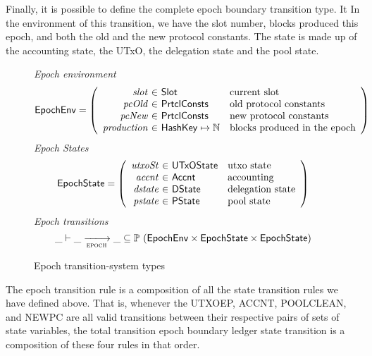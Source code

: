 Finally, it is possible to define the complete epoch boundary transition type. It
In the environment of this transition, we have the slot number, blocks produced
this epoch, and both the old and the new protocol constants. The state is
made up of the accounting state, the UTxO, the delegation state and the
pool state.

\begin{figure}[htb]
  \emph{Epoch environment}
  \begin{equation*}
    \EpochEnv =
    \left(
      \begin{array}{r@{~\in~}ll}
        \var{slot} & \Slot & \text{current slot}\\
        \var{pcOld} & \PrtclConsts & \text{old protocol constants}\\
        \var{pcNew} & \PrtclConsts & \text{new protocol constants}\\
        \var{production} & \HashKey \mapsto \mathbb{N} & \text{blocks produced in the epoch}\\
      \end{array}
    \right)
  \end{equation*}
  \emph{Epoch States}
  \begin{equation*}
    \EpochState =
    \left(
      \begin{array}{r@{~\in~}ll}
        \var{utxoSt} & \UTxOState & \text{utxo state}\\
        \var{accnt} & \Accnt & \text{accounting}\\
        \var{dstate} & \DState & \text{delegation state}\\
        \var{pstate} & \PState & \text{pool state}\\
      \end{array}
    \right)
  \end{equation*}
  \emph{Epoch transitions}
  \begin{equation*}
    \_ \vdash
    \var{\_} \trans{epoch}{} \var{\_}
    \subseteq \powerset (\EpochEnv \times \EpochState \times \EpochState)
  \end{equation*}
  \caption{Epoch transition-system types}
  \label{fig:ts-types:epoch}
\end{figure}


The epoch transition rule is a composition of all the state transition rules
we have defined above. That is, whenever the UTXOEP, ACCNT, POOLCLEAN, and
NEWPC are all valid transitions between their respective pairs of sets of
state variables, the total transition epoch boundary ledger state transition
is a composition of these four rules in that order.

